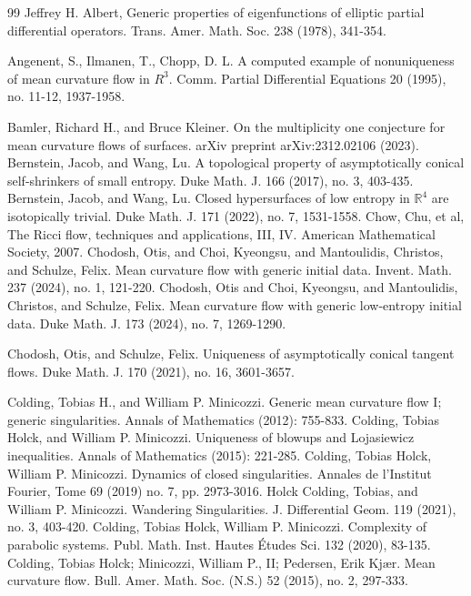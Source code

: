 \documentclass[12pt]{amsart}
\numberwithin{equation}{section}
\numberwithin{equation}{section}
\begin{document}
	
	\begin{thebibliography}{99}
		 Jeffrey H. Albert, {Generic properties of eigenfunctions of elliptic partial differential operators.} Trans. Amer. Math. Soc. 238 (1978), 341-354.
		
		 Angenent, S., Ilmanen, T., Chopp, D. L. {A computed example of nonuniqueness of mean curvature flow in $R^3$.} 
		Comm. Partial Differential Equations 20 (1995), no. 11-12, 1937-1958.
		
		 Bamler, Richard H., and Bruce Kleiner. {On the multiplicity one conjecture for mean curvature flows of surfaces.} arXiv preprint arXiv:2312.02106 (2023).
		 Bernstein, Jacob, and Wang, Lu. {A topological property of asymptotically conical self-shrinkers of small entropy.} Duke Math. J. 166 (2017), no. 3, 403-435. 
		 Bernstein, Jacob, and Wang, Lu. {Closed hypersurfaces of low entropy in $\mathbb{R}^4$ are isotopically trivial.} Duke Math. J. 171 (2022), no. 7, 1531-1558.
		 Chow, Chu, et al, {The Ricci flow, techniques and applications, III, IV.} American Mathematical Society, 2007.
		 Chodosh, Otis, and Choi, Kyeongsu, and Mantoulidis, Christos, and Schulze, Felix. {Mean curvature flow with generic initial data.} 
		Invent. Math. 237 (2024), no. 1, 121-220.
		 Chodosh, Otis and Choi, Kyeongsu, and Mantoulidis, Christos, and Schulze, Felix. {Mean curvature flow with generic low-entropy initial data.} Duke Math. J. 173 (2024), no. 7, 1269-1290.
		
		 Chodosh, Otis, and Schulze, Felix. {Uniqueness of asymptotically conical tangent flows.} Duke Math. J. 170 (2021), no. 16, 3601-3657.
		
		 Colding, Tobias H., and William P. Minicozzi. {Generic mean curvature flow I; generic singularities.} Annals of Mathematics (2012): 755-833.
		 Colding, Tobias Holck, and William P. Minicozzi. {Uniqueness of blowups and Lojasiewicz inequalities.} Annals of Mathematics (2015): 221-285.
		 Colding, Tobias Holck, William P. Minicozzi. {Dynamics of closed singularities.} Annales de l'Institut Fourier, Tome 69 (2019) no. 7, pp. 2973-3016.
		 Holck Colding, Tobias, and William P. Minicozzi. {Wandering Singularities.} J. Differential Geom. 119 (2021), no. 3, 403-420.
		 Colding, Tobias Holck, William P. Minicozzi. {Complexity of parabolic systems.} Publ. Math. Inst. Hautes \'Etudes Sci. 132 (2020), 83-135.
		 Colding, Tobias Holck; Minicozzi, William P., II; Pedersen, Erik Kj\ae r. {Mean curvature flow.} Bull. Amer. Math. Soc. (N.S.) 52 (2015), no. 2, 297-333.
		

\end{thebibliography}
\end{document}
